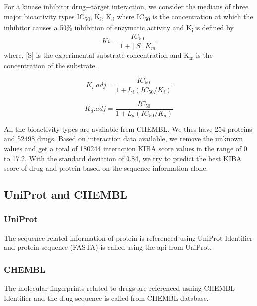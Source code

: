 For a kinase inhibitor drug−target interaction, we consider the medians of three major bioactivity types IC\textsubscript{50}, K\textsubscript{i}, K\textsubscript{d} where
IC\textsubscript{50} \cite{Tang2013} is the concentration at which the inhibitor causes a 50\% inhibition of enzymatic activity and K\textsubscript{i} is defined by \begin{equation}
    Ki = \frac{IC_{50}} {1 + [S]  K_m}
    \label{eq:ki}
\end{equation} 
where,  [{S}] is the experimental substrate concentration and K\textsubscript{m} is the concentration of the substrate.

\begin{equation}
K_i.{adj} = \frac{IC_{50}}{1 + L_i(IC_{50}/K_i)}
\label{eq:ki_adj}
\end{equation}

\begin{equation}
K_d.{adj} = \frac{IC_{50}}{1 + L_d(IC_{50}/K_d)}
\end{equation}

All the bioactivity types are available from CHEMBL.\cite{Gaulton2017} We thus have 254 proteins and 52498 drugs. Based on interaction data available, we remove the unknown values and get a total of 180244 interaction KIBA score values in the range of 0 to 17.2. With the standard deviation of 0.84, we try to predict the best KIBA score of drug and protein based on the sequence information alone.

\subsection{UniProt and CHEMBL }

\subsubsection{UniProt} 
The sequence related information of protein is referenced using UniProt Identifier and protein sequence (FASTA) is called using the api from UniProt. \cite{UniProtConsortium2018}


\subsubsection{CHEMBL}
The molecular fingerprints related to drugs are referenced usning CHEMBL Identifier and the drug sequence is called from CHEMBL database. \cite{Gaulton2017}

